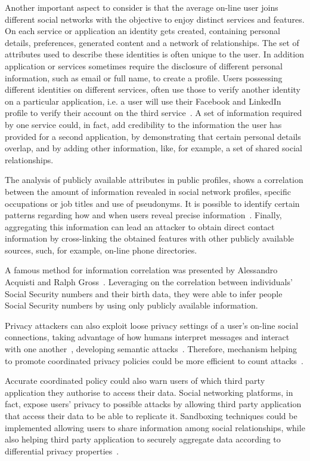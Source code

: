 Another important aspect to consider is that the average on-line user joins different social networks with the objective to enjoy distinct services and features. On each service or application an identity gets created, containing personal details, preferences, generated content and a network of relationships. The set of attributes used to describe these identities is often unique to the user. In addition application or services sometimes require the disclosure of different personal information, such as email or full name, to create a profile. Users possessing different identities on different services, often use those to verify another identity on a particular application, i.e. a user will use their Facebook and LinkedIn profile to verify their account on the third service~\cite{paridhi-et-al}. A set of information required by one service could, in fact, add credibility to the information the user has provided for a second application, by demonstrating that certain personal details overlap, and by adding other information, like, for example, a set of shared social relationships.

The analysis of publicly available attributes in public profiles, shows a correlation between the amount of information revealed in social network profiles, specific occupations or job titles and use of pseudonyms. It is possible to identify certain patterns regarding how and when users reveal precise information~\cite{chen-et-al}. Finally, aggregating this information can lead an attacker to obtain direct contact information by cross-linking the obtained features with other publicly available sources, such, for example, on-line phone directories.

A famous method for information correlation was presented by Alessandro Acquisti and Ralph Gross~\cite{acquisti-et-al}. Leveraging on the correlation between individuals' Social Security numbers and their birth data, they were able to infer people Social Security numbers by using only publicly available information.

Privacy attackers can also exploit loose privacy settings of a user's on-line social connections, taking advantage of how humans interpret messages and interact with one another~\cite{cryto-gram}, developing semantic attacks~\cite{Kumaragur-et-all}. Therefore, mechanism helping to promote coordinated privacy policies could be more efficient to count attacks~\cite{brown-et-all}. 

Accurate coordinated policy could also warn users of which third party application they authorise to access their data. Social networking platforms, in fact, expose users' privacy to possible attacks by allowing third party application that access their data to be able to replicate it. Sandboxing techniques could be implemented allowing users to share information among social relationships, while also helping third party application to securely aggregate data according to differential privacy properties~\cite{viswanath2012keeping}. 

